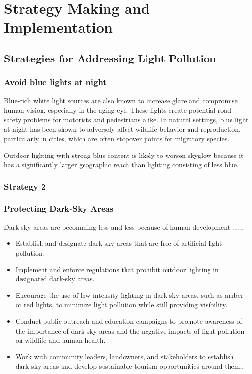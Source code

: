 \MinParskip{}

\section{Strategy Making and Implementation}



\subsection{Strategies for Addressing Light Pollution}

\subsubsection{Avoid blue lights at night}
Blue-rich white light sources are also known to increase glare and compromise human vision, especially in the aging eye. These lights create potential road safety problems for motorists and pedestrians alike. In natural settings, blue light at night has been shown to adversely affect wildlife behavior and reproduction, particularly in cities, which are often stopover points for migratory species.

Outdoor lighting with strong blue content is likely to worsen skyglow because it has a significantly larger geographic reach than lighting consisting of less blue. \cite{light_pollution}

\subsubsection{Strategy 2}

\subsubsection{Protecting Dark-Sky Areas}
Dark-sky areas are becomming less and less because of human development ......

\begin{itemize}
    \item Establish and designate dark-sky areas that are free of artificial light pollution.

    \item Implement and enforce regulations that prohibit outdoor lighting in designated dark-sky areas.

    \item Encourage the use of low-intensity lighting in dark-sky areas, such as amber or red lights, to minimize light pollution while still providing visibility.

    \item Conduct public outreach and education campaigns to promote awareness of the importance of dark-sky areas and the negative impacts of light pollution on wildlife and human health.

    \item Work with community leaders, landowners, and stakeholders to establish dark-sky areas and develop sustainable tourism opportunities around them..
\end{itemize}


